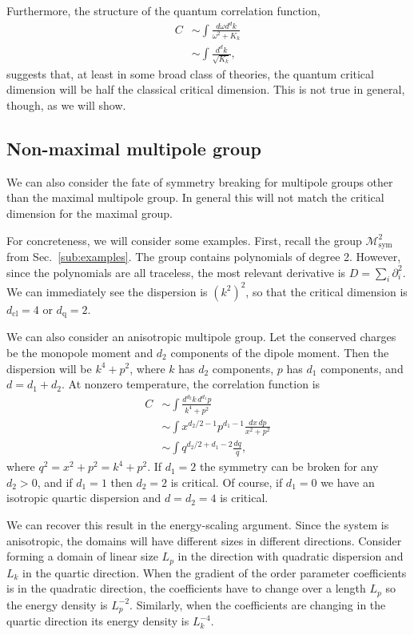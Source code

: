 \documentclass[prb,aps,twocolumn, amsfonts,amsmath,amssymb,nofootinbib,superscriptaddress]{revtex4-2}
\newcommand{\nn}{\nonumber\\}
\newcommand{\cl}{\text{cl}}
\newcommand{\q}{\text{q}}
\begin{document}
Furthermore, the structure of the quantum correlation function,
\begin{align}
C &\sim \int \frac{d\omega d^dk}{\omega^2 + K_k}\nn
&\sim \int \frac{d^dk}{\sqrt{K_k}},
\end{align}
suggests that, at least in some broad class of theories, the quantum critical dimension will be half the classical critical dimension. This is not true in general, though, as we will show.

\subsection{Non-maximal multipole group} \label{sub:nonmax}

We can also consider the fate of symmetry breaking for multipole groups other than the maximal multipole group. In general this will not match the critical dimension for the maximal group. 

For concreteness, we will consider some examples. First, recall the group $\mathcal{M}^2_\text{sym}$ from Sec.~\ref{sub:examples}. The group contains polynomials of degree 2. However, since the polynomials are all traceless, the most relevant derivative is $D = \sum_i \partial^2_i$.  We can immediately see the dispersion is $(k^2)^2$, so that the critical dimension is $d_\cl = 4$ or $d_\q = 2$.

We can also consider an anisotropic multipole group. 
Let the conserved charges be the monopole moment and $d_2$ components of the dipole moment. Then the dispersion will be $k^4 + p^2$, where $k$ has $d_2$ components, $p$ has $d_1$ components, and $d = d_1+d_2$. At nonzero temperature, the correlation function is
\begin{align}
C &\sim \int \frac{d^{d_2} k \, d^{d_1} p}{k^4 + p^2}\nn
&\sim \int x^{d_2/2 -1} p^{d_1-1} \frac{dx\, dp}{x^2 +p^2} \nn
&\sim \int q^{d_2/2 + d_1 - 2}\frac{dq}{q},
\end{align}
where $q^2 = x^2 + p^2 = k^4 + p^2$. 
If $d_1=2$ the symmetry can be broken for any $d_2>0$, and if $d_1=1$ then $d_2=2$  is critical. Of course, if $d_1=0$ we have an isotropic quartic dispersion and $d=d_2=4$ is critical. 

We can recover this result in  the energy-scaling argument. Since the system is anisotropic, the domains will have different sizes in different directions. Consider forming a domain of linear size $L_p$ in the  direction with quadratic dispersion and $L_k$ in the quartic direction. When the gradient of the order parameter coefficients is in the quadratic direction, the coefficients have to change over a length $L_p$ so the energy density is $L_p^{-2}$. Similarly, when the coefficients are changing in the quartic direction its energy density is $L_k^{-4}$. 
\end{document}
